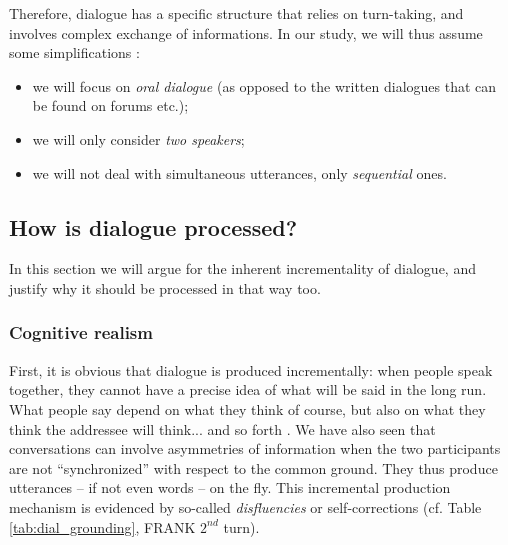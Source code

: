 \documentclass[11pt]{article}
\begin{document}
			Therefore, dialogue has a specific structure that relies on turn-taking, and involves complex exchange of informations. In our study, we will thus assume some simplifications :
			\begin{itemize}
				\item we will focus on \textit{oral dialogue} (as opposed to the written dialogues that can be found on forums etc.);
				\item we will only consider \textit{two speakers};
				\item we will not deal with simultaneous utterances, only \textit{sequential} ones.
			\end{itemize}
			
		\subsection{How is dialogue processed?}
			In this section we will argue for the inherent incrementality of dialogue, and justify why it should be processed in that way too.
			\subsubsection{Cognitive realism}
				First, it is obvious that dialogue is produced incrementally: when people speak together, they cannot have a precise idea of what will be said in the long run. What people say depend on what they think of course, but also on what they think the addressee will think... and so forth \cite{frank2016}. We have also seen that conversations can involve asymmetries of information when the two participants are not ``synchronized'' with respect to the common ground. They thus produce utterances -- if not even words -- on the fly. This incremental production mechanism is evidenced by so-called \textit{disfluencies} or self-corrections (cf. Table \ref{tab:dial_grounding}, FRANK $2^{nd}$ turn).\\
				
\end{document}
